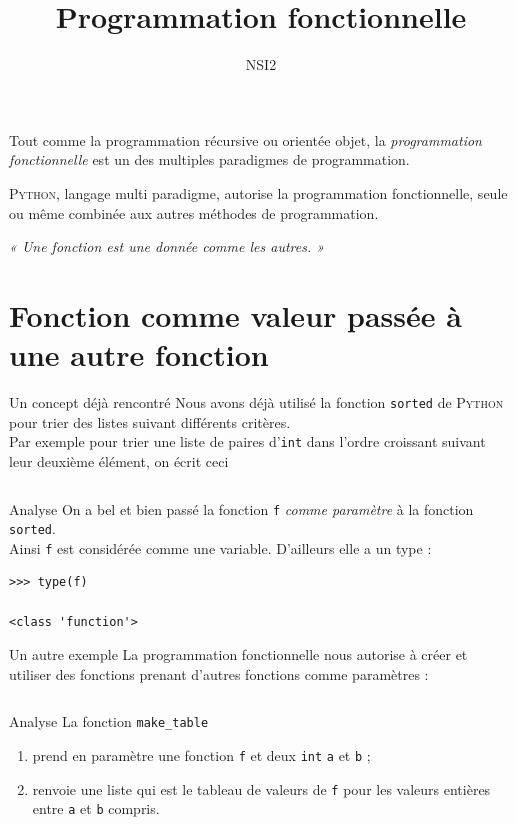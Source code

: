 \documentclass[10pt]{beamer}
\title{Programmation fonctionnelle}
\author{NSI2}
\begin{document}
\maketitle


\begin{frame}{}
	Tout comme la programmation récursive ou orientée objet, la \textit{programmation fonctionnelle} est un des multiples paradigmes de programmation.\\
\pause

\textsc{Python}, langage multi paradigme, autorise la programmation fonctionnelle, seule ou même combinée aux autres méthodes de programmation.\\\pause

\textit{« Une fonction est une donnée comme les autres. »}
\end{frame}



\section{Fonction comme valeur passée à une autre fonction}

\begin{frame}[fragile]{Un concept déjà rencontré}
	Nous avons déjà utilisé la fonction \texttt{sorted} de \textsc{Python} pour trier des listes suivant différents critères.\\\pause
Par exemple pour trier une liste de paires d'\texttt{int} dans l'ordre croissant suivant leur deuxième élément, on écrit ceci\pause

\inputminted{python}{scripts/sort1.py}
\end{frame}

\begin{frame}[fragile]{Analyse}
On a bel et bien passé la fonction \texttt{f} \textit{comme paramètre} à la fonction \texttt{sorted}.\\\pause
Ainsi \texttt{f} est considérée comme une variable. D'ailleurs elle a un type :\pause
\begin{verbatim}
>>> type(f)

<class 'function'>
\end{verbatim}
\end{frame} 

\begin{frame}[fragile]{Un autre exemple}
La programmation fonctionnelle nous autorise à créer et utiliser des fonctions prenant d'autres fonctions comme paramètres :\pause

\inputminted{python}{scripts/func1.py}
\end{frame}
\begin{frame}{Analyse}
La fonction \texttt{make\_table}\pause
\begin{enumerate}[--]
	\item 	prend en paramètre une fonction \texttt{f} et deux \texttt{int} \texttt{a} et \texttt{b} ;\pause
	\item 	renvoie une liste qui est le tableau de valeurs de \texttt{f} pour les valeurs entières entre \texttt{a} et \texttt{b} compris.	
\end{enumerate}
\end{frame}
\end{document}
